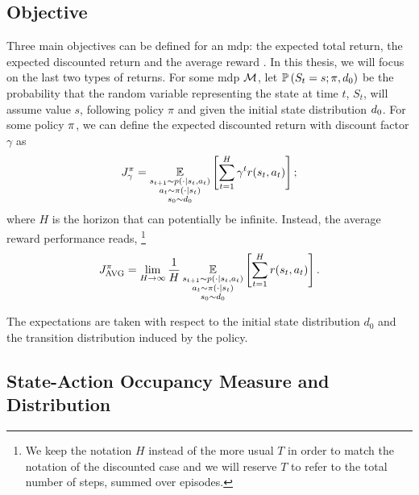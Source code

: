\subsection{Objective}
\label{subsec:objective}
Three main objectives can be defined for an \gls{mdp}: the expected total return, the expected discounted return and the average reward \cite{puterman1994markov}.
In this thesis, we will focus on the last two types of returns.
For some \gls{mdp} $\mathcal{M}$, let $\mathbb{P}\left(S_t=s; \pi,d_0\right)$ be the probability that the random variable representing the state at time $t$, $S_t$, will assume value $s$, following policy $\pi$ and given the initial state distribution $d_0$. 
For some policy $\pi$, we can define the expected discounted return with discount factor $\gamma$ as
\begin{align}
\label{eq:discounted_reward}
    \expectedreturn[\gamma] = \expectedvalue_{\substack{s_{t+1}\sim p(\cdot\vert s_t,a_t)\\a_t\sim\pi(\cdot\vert s_t)\\s_0\sim \initialstatedistribution}}\left[\sum_{t=1}^H \gamma^t r(s_t,a_t) \right];
\end{align}
where $H$ is the horizon that can potentially be infinite. 
Instead, the average reward performance reads, \footnote{We keep the notation $H$ instead of the more usual $T$ in order to match the notation of the discounted case and we will reserve $T$ to refer to the total number of steps, summed over episodes.}
\begin{align*}
    \averagereturnfunction = \lim_{H\rightarrow \infty}\frac{1}{H}\expectedvalue_{\substack{s_{t+1}\sim p(\cdot\vert s_t,a_t)\\a_t\sim\pi(\cdot\vert s_t)\\s_0\sim \initialstatedistribution}}\left[\sum_{t=1}^H r(s_t,a_t) \right].
\end{align*}

The expectations are taken with respect to the initial state distribution $d_0$ and the transition distribution induced by the policy.

\subsection{State-Action Occupancy Measure and Distribution}
\label{subsec:def_state_distrib}

